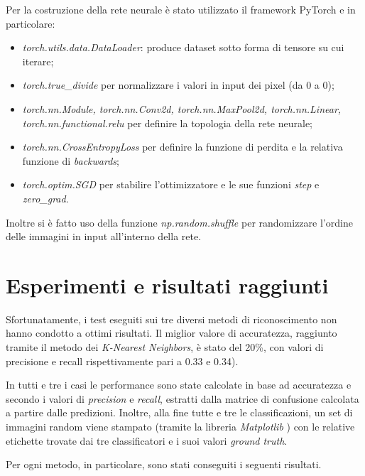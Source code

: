 \documentclass[11pt, a4paper, titlepage]{article}
\begin{document}
\medskip 
Per la costruzione della rete neurale è stato utilizzato il framework PyTorch \cite{pytorch} e in particolare:
\begin{itemize}
    \item \emph{torch.utils.data.DataLoader}: produce dataset sotto forma di tensore su cui iterare;
    \item \emph{torch.true\_divide} per normalizzare i valori in input dei pixel (da 0 a 0);
    \item \emph{torch.nn.Module, torch.nn.Conv2d, torch.nn.MaxPool2d, torch.nn.Linear, torch.nn.functional.relu} per definire la topologia della rete neurale;
    \item \emph{torch.nn.CrossEntropyLoss} per definire la funzione di perdita e la relativa funzione di \emph{backwards};
    \item \emph{torch.optim.SGD} per stabilire l'ottimizzatore e le sue funzioni \emph{step} e \emph{zero\_grad}.
\end{itemize}

Inoltre si è fatto uso della funzione \emph{np.random.shuffle} \cite{numpy1}\cite{numpy2} per randomizzare l'ordine delle immagini in input all'interno della rete. 

\newpage
\section{Esperimenti e risultati raggiunti}
Sfortunatamente, i test eseguiti sui tre diversi metodi di riconoscimento non hanno condotto a ottimi risultati. Il miglior valore di accuratezza, raggiunto tramite il metodo dei \emph{K-Nearest Neighbors}, è stato del 20\%, con valori di precisione e recall rispettivamente pari a 0.33 e 0.34).

In tutti e tre i casi le performance sono state calcolate in base ad accuratezza e secondo i valori di \emph{precision} e \emph{recall}, estratti dalla matrice di confusione calcolata a partire dalle predizioni. Inoltre, alla fine tutte e tre le classificazioni, un set di immagini random viene stampato (tramite la libreria \emph{Matplotlib} \cite{matplotlib}) con le relative etichette trovate dai tre classificatori e i suoi valori \emph{ground truth}.

\medskip
Per ogni metodo, in particolare, sono stati conseguiti i seguenti risultati. 
\end{document}
